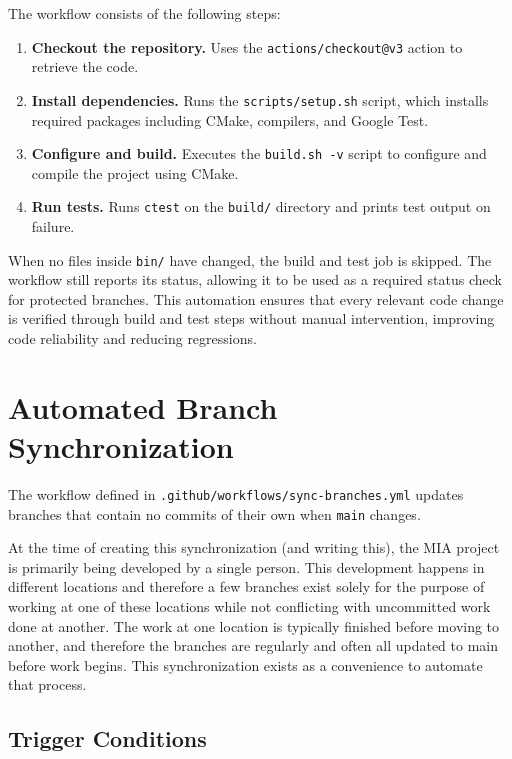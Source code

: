 The workflow consists of the following steps:
\begin{enumerate}
	\item \textbf{Checkout the repository.} Uses the \texttt{actions/checkout@v3} action to retrieve the code.
	\item \textbf{Install dependencies.} Runs the \texttt{scripts/setup.sh} script, which installs required packages including CMake, compilers, and Google Test.
	\item \textbf{Configure and build.} Executes the \texttt{build.sh -v} script to configure and compile the project using CMake.
	\item \textbf{Run tests.} Runs \texttt{ctest} on the \texttt{build/} directory and prints test output on failure.
\end{enumerate}
When no files inside \texttt{bin/} have changed, the build and test job is skipped. The workflow still reports its status, allowing it to be used as a required status check for protected branches. This automation ensures that every relevant code change is verified through build and test steps without manual intervention, improving code reliability and reducing regressions. 









\section{Automated Branch Synchronization}\label{section:branch_synchronization}

The workflow defined in \texttt{.github/workflows/sync-branches.yml} updates branches that contain no commits of their own when \texttt{main} changes.

At the time of creating this synchronization (and writing this), the MIA project is primarily being developed by a single person. This development happens in different locations and therefore a few branches exist solely for the purpose of working at one of these locations while not conflicting with uncommitted work done at another. The work at one location is typically finished before moving to another, and therefore the branches are regularly and often all updated to main before work begins. This synchronization exists as a convenience to automate that process.

\subsection{Trigger Conditions}

